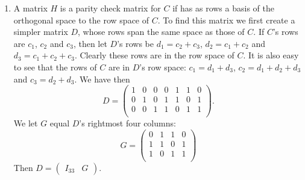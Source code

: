 \documentclass[11pt]{article} \usepackage{amssymb}
\begin{document}
\begin{enumerate}
\begin{enumerate}
      \begin{tabular}{c c c c c c c}
        (0& 0& 0& 0& 0& 0& 0)\\
        (0& 1& 1& 0& 1& 1& 0)\\
        (1& 1& 1& 0& 0& 0& 0)\\
        (1& 0& 0& 0& 1& 1& 0)\\
        (1& 0& 1& 1& 1& 0& 1)\\
        (1& 1& 0& 1& 0& 1& 1)\\
        (0& 1& 0& 1& 1& 0& 1)\\
        (0& 0& 1& 1& 0& 1& 1)\\
      \end{tabular}

      The minimum distance is three. Therefore if a vector is at distance one
      from some codeword it cannot be at distance one or less from another
      codeword, since the triangle inequality holds for the Hamming distance.
      Therefore this code can correct and locate all single errors.
      
    \item
      A matrix $H$ is a parity check matrix for $C$ if has as rows a basis 
      of the orthogonal
      space to the row space of $C$. To find this matrix we first create a 
      simpler matrix $D$, whose rows span the same space as those of $C$. If $C$'s
      rows are $c_1$, $c_2$ and $c_3$, then let $D$'s rows be $d_1=c_2+c_3$, 
      $d_2=c_1+c_2$ and $d_3=c_1+c_2+c_3$. Clearly these rows are in the row 
      space of $C$. It is
      also easy to see that the rows of $C$ are in $D$'s row space:
      $c_1=d_1+d_3$, $c_2=d_1+d_2+d_3$ and $c_3=d_2+d_3$. We have then
      \begin{equation*}
        D=
        \begin{pmatrix}
          1 & 0 & 0 & 0 & 1 & 1 & 0\\
          0 & 1 & 0 & 1 & 1 & 0 & 1\\
          0 & 0 & 1 & 1 & 0 & 1 & 1\\
        \end{pmatrix}.
      \end{equation*}
      We let $G$ equal $D$'s rightmost four columns:
      \begin{equation*}
        G=
        \begin{pmatrix}
          0 & 1 & 1 & 0\\
          1 & 1 & 0 & 1\\
          1 & 0 & 1 & 1\\
        \end{pmatrix}
      \end{equation*}
      Then $D=\begin{pmatrix}I_{33}& G\end{pmatrix}$.


\end{enumerate}
\end{enumerate}
\end{document}
